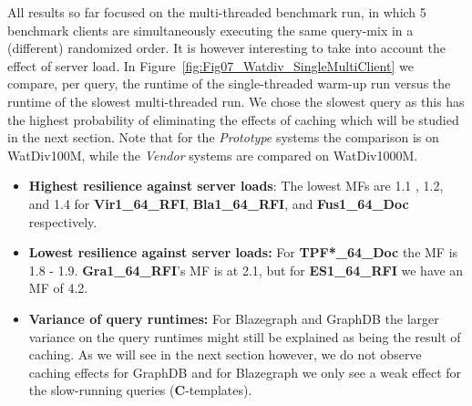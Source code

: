 \documentclass[twocolumn]{bmcart}%
\begin{document}
%
All results so far focused on the multi-threaded benchmark run, in which 5 benchmark clients are simultaneously executing the same query-mix in a (different) randomized order. It is however interesting to take into account the effect of server load. In Figure~\ref{fig:Fig07_Watdiv_SingleMultiClient} we compare, per query, the runtime of the single-threaded warm-up run versus the runtime of the slowest multi-threaded run. We chose the slowest query as this has the highest probability of eliminating the effects of caching which will be studied in the next section. Note that for the \emph{Prototype} systems the comparison is on WatDiv100M, while the \emph{Vendor} systems are compared on WatDiv1000M.


\begin{itemize}
	\item \textbf{Highest resilience against server loads}: The lowest MFs are 1.1 , 1.2, and 1.4 for \textbf{Vir1\_64\_RFI}, \textbf{Bla1\_64\_RFI}, and \textbf{Fus1\_64\_Doc} respectively. 
	
	\item \textbf{Lowest resilience against server loads:} For \textbf{TPF*\_64\_Doc} the MF is 1.8 - 1.9.  \textbf{Gra1\_64\_RFI}'s MF is at 2.1, but for \textbf{ES1\_64\_RFI} we have an MF of 4.2.
	
	\item \textbf{Variance of query runtimes:} For Blazegraph and GraphDB the larger variance on the query runtimes might still be explained as being the result of caching. As we will see in the next section however, we do not observe caching effects for GraphDB and for Blazegraph we only see a weak effect for the slow-running queries (\textbf{C}-templates).
\end{itemize}
\end{document}
